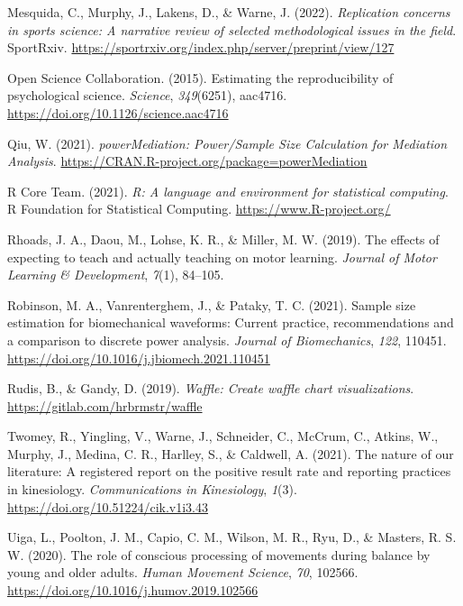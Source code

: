 \documentclass[
  man, donotrepeattitle,mask,floatsintext]{apa7}
\newlength{\cslhangindent}
\newlength{\cslentryspacingunit} %
\newenvironment{CSLReferences}[2] %
 {%
  \setlength{\parindent}{0pt}
  \ifodd #1
  \let\oldpar\par
  \def\par{\hangindent=\cslhangindent\oldpar}
  \fi
  \setlength{\parskip}{#2\cslentryspacingunit}
 }%
 {}
\begin{document}
\begin{CSLReferences}{1}{0}
\leavevmode{}%
Mesquida, C., Murphy, J., Lakens, D., \& Warne, J. (2022). \emph{Replication concerns in sports science: A narrative review of selected methodological issues in the field}. SportRxiv. \url{https://sportrxiv.org/index.php/server/preprint/view/127}

\leavevmode{}%
Open Science Collaboration. (2015). Estimating the reproducibility of psychological science. \emph{Science}, \emph{349}(6251), aac4716. \url{https://doi.org/10.1126/science.aac4716}

\leavevmode{}%
Qiu, W. (2021). \emph{{powerMediation}: {Power}/{Sample} {Size} {Calculation} for {Mediation} {Analysis}}. \url{https://CRAN.R-project.org/package=powerMediation}

\leavevmode{}%
R Core Team. (2021). \emph{R: A language and environment for statistical computing}. R Foundation for Statistical Computing. \url{https://www.R-project.org/}

\leavevmode{}%
Rhoads, J. A., Daou, M., Lohse, K. R., \& Miller, M. W. (2019). The effects of expecting to teach and actually teaching on motor learning. \emph{Journal of Motor Learning \& Development}, \emph{7}(1), 84--105.

\leavevmode{}%
Robinson, M. A., Vanrenterghem, J., \& Pataky, T. C. (2021). Sample size estimation for biomechanical waveforms: Current practice, recommendations and a comparison to discrete power analysis. \emph{Journal of Biomechanics}, \emph{122}, 110451. \url{https://doi.org/10.1016/j.jbiomech.2021.110451}

\leavevmode{}%
Rudis, B., \& Gandy, D. (2019). \emph{Waffle: Create waffle chart visualizations}. \url{https://gitlab.com/hrbrmstr/waffle}

\leavevmode{}%
Twomey, R., Yingling, V., Warne, J., Schneider, C., McCrum, C., Atkins, W., Murphy, J., Medina, C. R., Harlley, S., \& Caldwell, A. (2021). The nature of our literature: A registered report on the positive result rate and reporting practices in kinesiology. \emph{Communications in Kinesiology}, \emph{1}(3). \url{https://doi.org/10.51224/cik.v1i3.43}

\leavevmode{}%
Uiga, L., Poolton, J. M., Capio, C. M., Wilson, M. R., Ryu, D., \& Masters, R. S. W. (2020). The role of conscious processing of movements during balance by young and older adults. \emph{Human Movement Science}, \emph{70}, 102566. \url{https://doi.org/10.1016/j.humov.2019.102566}


\end{CSLReferences}
\end{document}
